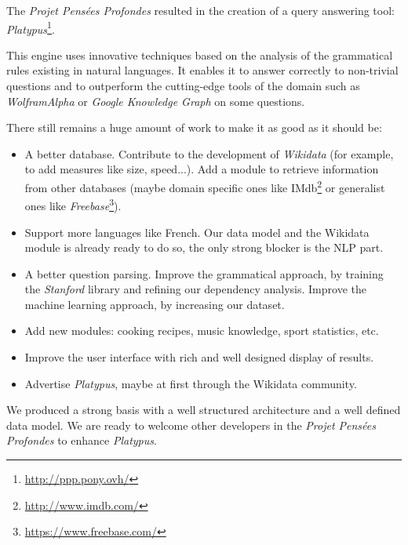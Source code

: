 The \emph{Projet Pensées Profondes} resulted in the creation of a query answering tool: \emph{Platypus}\footnote{\url{http://ppp.pony.ovh/}}.

This engine uses innovative techniques based on the analysis of the grammatical rules existing in natural languages. It enables it to answer correctly to non-trivial questions and to outperform the cutting-edge tools of the domain such as \emph{WolframAlpha} or \emph{Google Knowledge Graph} on some questions.

There still remains a huge amount of work to make it as good as it should be:
\begin{itemize}
    \item A better database. Contribute to the development of \emph{Wikidata} (for example, to add measures like size, speed...). Add a module to retrieve information from other databases (maybe domain specific ones like IMdb\footnote{\url{http://www.imdb.com/}} or generalist ones like \emph{Freebase}\footnote{\url{https://www.freebase.com/}}).
    \item Support more languages like French. Our data model and the Wikidata module is already ready to do so, the only strong blocker is the NLP part.
    \item A better question parsing. Improve the grammatical approach, by training the \emph{Stanford} library and refining our dependency analysis. Improve the machine learning approach, by increasing our dataset.
    \item Add new modules: cooking recipes, music knowledge, sport statistics, etc.
    \item Improve the user interface with rich and well designed display of results.
    \item Advertise \emph{Platypus}, maybe at first through the Wikidata community.
\end{itemize}

We produced a strong basis with a well structured architecture and a well defined data model. We are ready to welcome other developers in the \emph{Projet Pensées Profondes} to enhance \emph{Platypus}.

